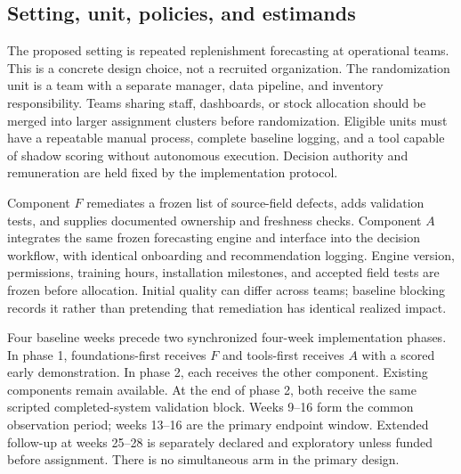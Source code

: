 \documentclass[11pt]{article}
\begin{document}
\subsection{Setting, unit, policies, and estimands}
The proposed setting is repeated replenishment forecasting at operational teams. This is a concrete design choice, not a recruited organization. The randomization unit is a team with a separate manager, data pipeline, and inventory responsibility. Teams sharing staff, dashboards, or stock allocation should be merged into larger assignment clusters before randomization. Eligible units must have a repeatable manual process, complete baseline logging, and a tool capable of shadow scoring without autonomous execution. Decision authority and remuneration are held fixed by the implementation protocol.

Component $F$ remediates a frozen list of source-field defects, adds validation tests, and supplies documented ownership and freshness checks. Component $A$ integrates the same frozen forecasting engine and interface into the decision workflow, with identical onboarding and recommendation logging. Engine version, permissions, training hours, installation milestones, and accepted field tests are frozen before allocation. Initial quality can differ across teams; baseline blocking records it rather than pretending that remediation has identical realized impact.

Four baseline weeks precede two synchronized four-week implementation phases. In phase 1, foundations-first receives $F$ and tools-first receives $A$ with a scored early demonstration. In phase 2, each receives the other component. Existing components remain available. At the end of phase 2, both receive the same scripted completed-system validation block. Weeks 9--16 form the common observation period; weeks 13--16 are the primary endpoint window. Extended follow-up at weeks 25--28 is separately declared and exploratory unless funded before assignment. There is no simultaneous arm in the primary design.
\end{document}
